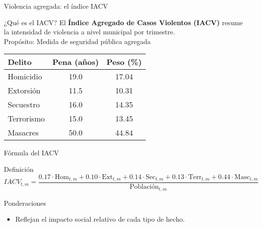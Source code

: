 
\begin{frame}{Violencia agregada: el índice IACV}
    \small
    \begin{block}{¿Qué es el IACV?}
        El \textbf{Índice Agregado de Casos Violentos (IACV)} resume la intensidad de violencia a nivel municipal por trimestre.\\ \alert{Propósito}: Medida de seguridad pública agregada
    \end{block}


        \centering
        \begin{tabular}{lcc}
            \toprule
            \textbf{Delito} & \textbf{Pena (años)} & \textbf{Peso (\%)} \\
            \midrule
            Homicidio & 19.0 & 17.04 \\
            Extorsión & 11.5 & 10.31 \\
            Secuestro & 16.0 & 14.35 \\
            Terrorismo & 15.0 & 13.45 \\
            Masacres & 50.0 & 44.84 \\
            \midrule
            
            \bottomrule
        \end{tabular}


\end{frame}


\begin{frame}{Fórmula del IACV}
    \small
    \begin{alertblock}{Definición}
        \[
        IACV_{t,m} = \frac{0.17 \cdot \text{Hom}_{t,m} + 0.10 \cdot \text{Ext}_{t,m} + 0.14 \cdot \text{Sec}_{t,m} + 0.13 \cdot \text{Terr}_{t,m} + 0.44 \cdot \text{Masc}_{t,m}}{\text{Población}_{t,m}}
        \]
    \end{alertblock}

    \begin{block}{Ponderaciones}
        \begin{itemize}
            \item Reflejan el impacto social relativo de cada tipo de hecho.

        \end{itemize}
    \end{block}
\end{frame}

